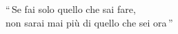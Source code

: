 
\begin{center}

    \linespread{1.5}\selectfont
    
    \fontsize{14pt}{16pt}\selectfont

    ``\,Se fai solo quello che sai fare,\\
    non sarai mai più di quello che sei ora\,''\\
    
\end{center}

